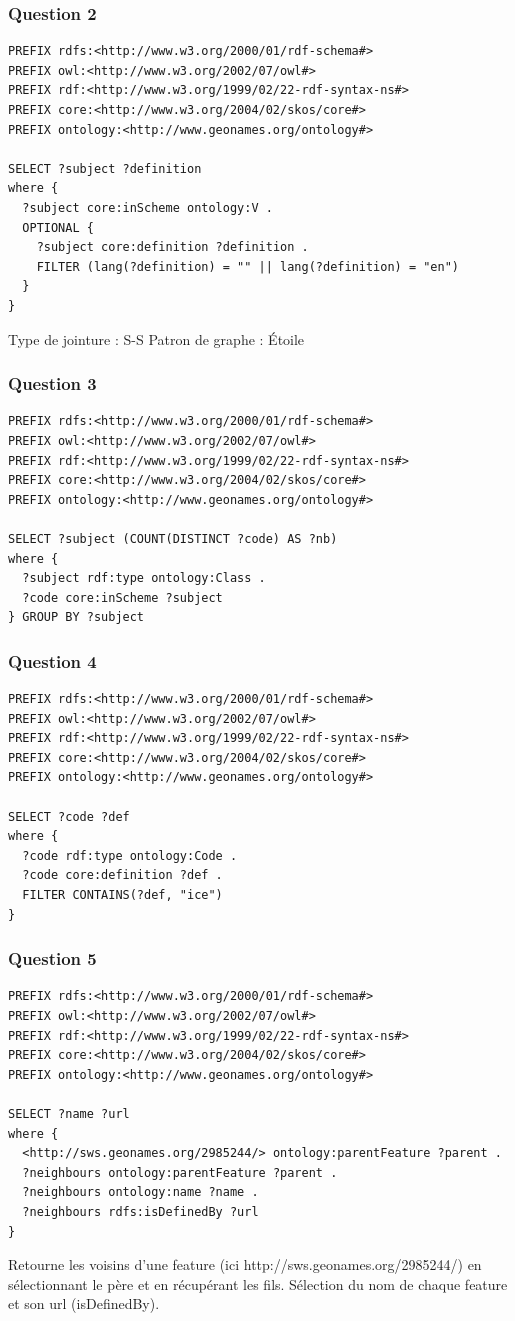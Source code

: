\subsubsection{Question 2}
\begin{verbatim}
PREFIX rdfs:<http://www.w3.org/2000/01/rdf-schema#>
PREFIX owl:<http://www.w3.org/2002/07/owl#>
PREFIX rdf:<http://www.w3.org/1999/02/22-rdf-syntax-ns#>
PREFIX core:<http://www.w3.org/2004/02/skos/core#>
PREFIX ontology:<http://www.geonames.org/ontology#>

SELECT ?subject ?definition
where {
  ?subject core:inScheme ontology:V .
  OPTIONAL {
    ?subject core:definition ?definition .
    FILTER (lang(?definition) = "" || lang(?definition) = "en")
  }
}
\end{verbatim}
Type de jointure : S-S Patron de graphe : Étoile
\subsubsection{Question 3}
\begin{verbatim}
PREFIX rdfs:<http://www.w3.org/2000/01/rdf-schema#>
PREFIX owl:<http://www.w3.org/2002/07/owl#>
PREFIX rdf:<http://www.w3.org/1999/02/22-rdf-syntax-ns#>
PREFIX core:<http://www.w3.org/2004/02/skos/core#>
PREFIX ontology:<http://www.geonames.org/ontology#>

SELECT ?subject (COUNT(DISTINCT ?code) AS ?nb)
where {
  ?subject rdf:type ontology:Class .
  ?code core:inScheme ?subject 
} GROUP BY ?subject
\end{verbatim}
\subsubsection{Question 4}
\begin{verbatim}
PREFIX rdfs:<http://www.w3.org/2000/01/rdf-schema#>
PREFIX owl:<http://www.w3.org/2002/07/owl#>
PREFIX rdf:<http://www.w3.org/1999/02/22-rdf-syntax-ns#>
PREFIX core:<http://www.w3.org/2004/02/skos/core#>
PREFIX ontology:<http://www.geonames.org/ontology#>

SELECT ?code ?def
where {
  ?code rdf:type ontology:Code .
  ?code core:definition ?def .
  FILTER CONTAINS(?def, "ice")
}
\end{verbatim}
\subsubsection{Question 5}
\begin{verbatim}
PREFIX rdfs:<http://www.w3.org/2000/01/rdf-schema#>
PREFIX owl:<http://www.w3.org/2002/07/owl#>
PREFIX rdf:<http://www.w3.org/1999/02/22-rdf-syntax-ns#>
PREFIX core:<http://www.w3.org/2004/02/skos/core#>
PREFIX ontology:<http://www.geonames.org/ontology#>

SELECT ?name ?url
where {
  <http://sws.geonames.org/2985244/> ontology:parentFeature ?parent .
  ?neighbours ontology:parentFeature ?parent .
  ?neighbours ontology:name ?name .
  ?neighbours rdfs:isDefinedBy ?url
}
\end{verbatim}
Retourne les voisins d'une feature (ici http://sws.geonames.org/2985244/) en sélectionnant le père et en récupérant les fils. Sélection du nom de chaque feature et son url (isDefinedBy).
